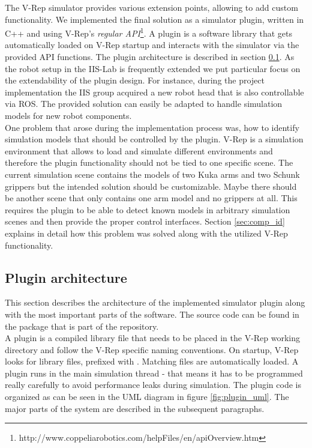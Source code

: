 The V-Rep simulator provides various extension points, allowing to add custom functionality. We implemented the final solution as a simulator plugin, written in C++ and using V-Rep's \emph{regular API}\footnote{http://www.coppeliarobotics.com/helpFiles/en/apiOverview.htm}. A plugin is a software library that gets automatically loaded on V-Rep startup and interacts with the simulator via the provided API functions. The plugin architecture is described in section \ref{sec:plugin_arch}. As the robot setup in the IIS-Lab is frequently extended we put particular focus on the extendability of the plugin design. For instance, during the project implementation the IIS group acquired a new robot head that is also controllable via ROS. The provided solution can easily be adapted to handle simulation models for new robot components. \\

One problem that arose during the implementation process was, how to identify simulation models that should be controlled by the plugin. V-Rep is a simulation environment that allows to load and simulate different environments and therefore the plugin functionality should not be tied to one specific scene. The current simulation scene contains the models of two Kuka arms and two Schunk grippers but the intended solution should be customizable. Maybe there should be another scene that only contains one arm model and no grippers at all. This requires the plugin to be able to detect known models in arbitrary simulation scenes and then provide the proper control interfaces. Section \ref{sec:comp_id} explains in detail how this problem was solved along with the utilized V-Rep functionality. \\

\subsection{Plugin architecture}
\label{sec:plugin_arch}

This section describes the architecture of the implemented simulator plugin along with the most important parts of the software. The source code can be found in the  package that is part of the  repository.\\

A plugin is a compiled library file that needs to be placed in the V-Rep working directory and follow the V-Rep specific naming conventions. On startup, V-Rep looks for library files, prefixed with . Matching files are automatically loaded. A plugin runs in the main simulation thread - that means it has to be programmed really carefully to avoid performance leaks during simulation. The plugin code is organized as can be seen in the UML diagram in figure \ref{fig:plugin_uml}. The major parts of the system are described in the subsequent paragraphs.

